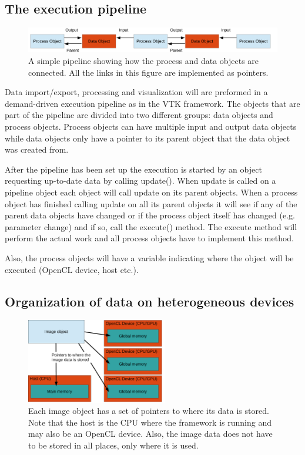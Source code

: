 \documentclass{article}
\begin{document}
\subsection{The execution pipeline}

\begin{figure}
    \centering
    \includegraphics[width=\textwidth]{pipeline_diagram.pdf}
    \caption{A simple pipeline showing how the process and data objects are connected. All the links in this figure are implemented as pointers.}
    \label{fig:pipeline_diagram}
\end{figure}

Data import/export, processing and visualization will are preformed in a demand-driven execution pipeline as in the VTK framework.
The objects that are part of the pipeline are divided into two different groups: data objects and process objects.
Process objects can have multiple input and output data objects while data objects only have a pointer to its parent object that the data object was created from.

After the pipeline has been set up the execution is started by an object requesting up-to-date data by calling update().
When update is called on a pipeline object each object will call update on its parent objects.
When a process object has finished calling update on all its parent objects it will see if any of the parent data objects have changed or if the process object itself has changed (e.g. parameter change) and if so, call the execute() method.
The execute method will perform the actual work and all process objects have to implement this method.

Also, the process objects will have a variable indicating where the object will be executed (OpenCL device, host etc.).


\subsection{Organization of data on heterogeneous devices}

\begin{figure}
    \centering
    \includegraphics[width=0.55\textwidth]{data_diagram.pdf}
    \caption{Each image object has a set of pointers to where its data is stored. 
        Note that the host is the CPU where the framework is running and may also be an OpenCL device. 
    Also, the image data does not have to be stored in all places, only where it is used.}
    \label{fig:data_diagram}
\end{figure}
\end{document}
